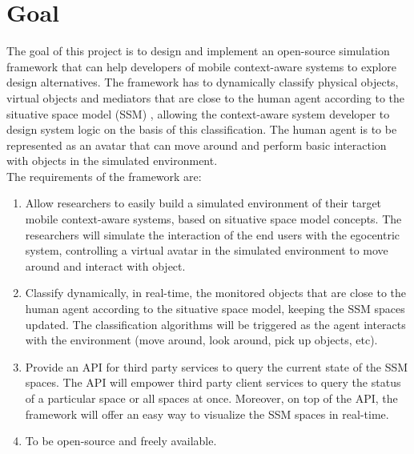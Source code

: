 \section{Goal} %
\label{sec:goal}
The goal of this project is to design and implement an open-source simulation framework that can help developers of mobile context-aware systems to explore design alternatives. The framework has to dynamically classify physical objects, virtual objects and mediators that are close to the human agent according to the situative space model (SSM) \cite{pederson2011situative}, allowing the context-aware system developer to design system logic on the basis of this classification. The human agent is to be represented as an avatar that can move around and perform basic interaction with objects in the simulated environment.\\

The requirements of the framework are:
\begin{enumerate}
	
	\item[\textlabel{1.}{goal:1}] Allow researchers to easily build a simulated environment of their target mobile context-aware systems, based on situative space model concepts. The researchers will simulate the interaction of the end users with the egocentric system, controlling a virtual avatar in the simulated environment to move around and interact with object.

	\item[\textlabel{2.}{goal:2}] Classify dynamically, in real-time, the monitored objects that are close to the human agent according to the situative space model, keeping the SSM spaces updated. The classification algorithms will be triggered as the agent interacts with the environment (move around, look around, pick up objects, etc).

	\item[\textlabel{3.}{goal:3}] Provide an API for third party services to query the current state of the SSM spaces. The API will empower third party client services to query the status of a particular space or all spaces at once. Moreover, on top of the API, the framework will offer an easy way to visualize the SSM spaces in real-time.

	\item[\textlabel{4.}{goal:4}] To be open-source and freely available.
\end{enumerate}

